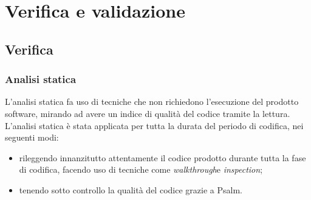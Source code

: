 

\chapter{Verifica e validazione}
\label{cap:verifica-validazione}

\section{Verifica}

\subsection{Analisi statica}
L'analisi statica fa uso di tecniche che non richiedono l'esecuzione del prodotto software, mirando ad avere un indice di qualità del codice tramite la lettura.
\\
L'analisi statica è stata applicata per tutta la durata del periodo di codifica, nei seguenti modi:
\begin{itemize}
    \item rileggendo innanzitutto attentamente il codice prodotto durante tutta la fase di codifica, facendo uso di tecniche come \emph{walkthrough}\glsfirstoccur e \emph{inspection}\glsfirstoccur;
    
    \item tenendo sotto controllo la qualità del codice grazie a Psalm.
\end{itemize}

